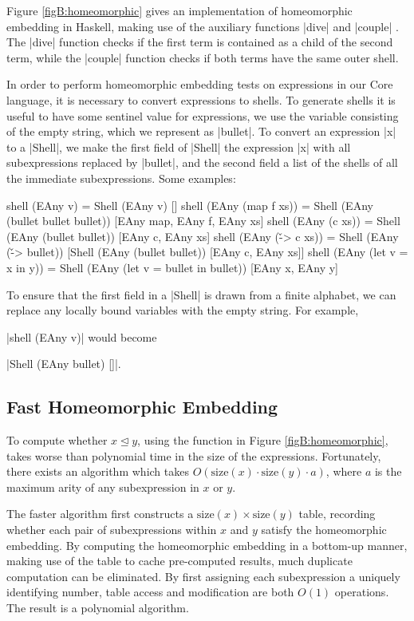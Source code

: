 Figure \ref{figB:homeomorphic} gives an implementation of homeomorphic embedding in Haskell, making use of the auxiliary functions |dive| and |couple| \cite{leuschel:homeomorphic}. The |dive| function checks if the first term is contained as a child of the second term, while the |couple| function checks if both terms have the same outer shell.

In order to perform homeomorphic embedding tests on expressions in our Core language, it is necessary to convert expressions to shells. To generate shells it is useful to have some sentinel value for expressions, we use the variable consisting of the empty string, which we represent as |bullet|. To convert an expression |x| to a |Shell|, we make the first field of |Shell| the expression |x| with all subexpressions replaced by |bullet|, and the second field a list of the shells of all the immediate subexpressions. Some examples:

\ignore\begin{code}
shell (EAny v)                 = Shell (EAny v) []
shell (EAny (map f xs))        = Shell (EAny (bullet bullet bullet)) [EAny map, EAny f, EAny xs]
shell (EAny (c xs))            = Shell (EAny (bullet bullet)) [EAny c, EAny xs]
shell (EAny (\v -> c xs))      = Shell (EAny (\v -> bullet)) [Shell (EAny (bullet bullet)) [EAny c, EAny xs]]
shell (EAny (let v = x in y))  = Shell (EAny (let v = bullet in bullet)) [EAny x, EAny y]
\end{code}

To ensure that the first field in a |Shell| is drawn from a finite alphabet, we can replace any locally bound variables with the empty string. For example, \ignore|shell (EAny v)| would become \ignore|Shell (EAny bullet) []|.

\subsection{Fast Homeomorphic Embedding}

To compute whether $x \unlhd y$, using the function in Figure \ref{figB:homeomorphic}, takes worse than polynomial time in the size of the expressions. Fortunately, there exists an algorithm \cite{stillman:computational_problems,stillman:homeomorphic} which takes $O(\text{size}(x) \cdot \text{size}(y) \cdot a)$, where $a$ is the maximum arity of any subexpression in $x$ or $y$.

The faster algorithm first constructs a $\text{size}(x) \times \text{size}(y)$ table, recording whether each pair of subexpressions within $x$ and $y$ satisfy the homeomorphic embedding. By computing the homeomorphic embedding in a bottom-up manner, making use of the table to cache pre-computed results, much duplicate computation can be eliminated. By first assigning each subexpression a uniquely identifying number, table access and modification are both $O(1)$ operations. The result is a polynomial algorithm.

